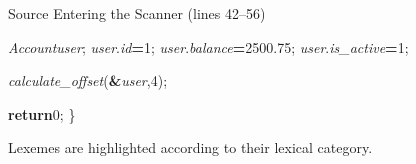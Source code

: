 \documentclass[aspectratio=169]{beamer}
\newcommand{\KW}[1]{\textcolor{keywordcolor}{\textbf{#1}}}
\newcommand{\ID}[1]{\textcolor{identifiercolor}{\textit{#1}}}
\newcommand{\INT}[1]{\colorbox{integercolor!15}{\textcolor{integercolor}{#1}}}
\newcommand{\FLOAT}[1]{\colorbox{floatcolor!15}{\textcolor{floatcolor}{#1}}}
\newcommand{\OP}[1]{\textcolor{operatorcolor}{\textbf{#1}}}
\newcommand{\DELIM}[1]{\textcolor{delimitercolor}{#1}}
\begin{document}
\begin{frame}[fragile]{Source Entering the Scanner (lines 42--56)}
\begin{block}{}
\hspace*{0.18em}\hspace*{0.18em}\hspace*{0.18em}\hspace*{0.18em}\ID{Account}\hspace*{0.18em}\ID{user}\DELIM{;}
\hspace*{0.18em}\hspace*{0.18em}\hspace*{0.18em}\hspace*{0.18em}\ID{user}\DELIM{.}\ID{id}\hspace*{0.18em}\OP{=}\hspace*{0.18em}\INT{1}\DELIM{;}
\hspace*{0.18em}\hspace*{0.18em}\hspace*{0.18em}\hspace*{0.18em}\ID{user}\DELIM{.}\ID{balance}\hspace*{0.18em}\OP{=}\hspace*{0.18em}\FLOAT{2500.75}\DELIM{;}
\hspace*{0.18em}\hspace*{0.18em}\hspace*{0.18em}\hspace*{0.18em}\ID{user}\DELIM{.}\ID{is\_active}\hspace*{0.18em}\OP{=}\hspace*{0.18em}\INT{1}\DELIM{;}

\hspace*{0.18em}\hspace*{0.18em}\hspace*{0.18em}\hspace*{0.18em}\ID{calculate\_offset}\DELIM{(}\OP{\&}\ID{user}\DELIM{,}\hspace*{0.18em}\INT{4}\DELIM{)}\DELIM{;}

\hspace*{0.18em}\hspace*{0.18em}\hspace*{0.18em}\hspace*{0.18em}\KW{return}\hspace*{0.18em}\INT{0}\DELIM{;}
\DELIM{\}}
\end{block}
\vspace{0.1cm}
{\tiny Lexemes are highlighted according to their lexical category.}
\end{frame}
\end{document}
